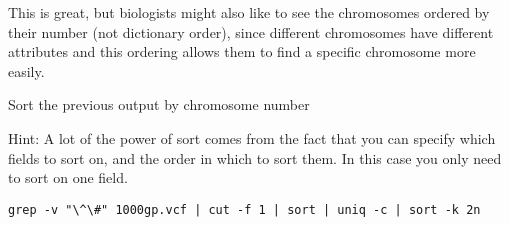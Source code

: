 \begin{note}
This is great, but biologists might also like to see the chromosomes ordered by their number (not dictionary order), since different chromosomes have different attributes and this ordering allows them to find a specific chromosome more easily.
\end{note}
\begin{questions}
Sort the previous output by chromosome number

Hint: A lot of the power of sort comes from the fact that you can specify which fields to sort on, and the order in which to sort them. In this case you only need to sort on one field.
\begin{answer}
\begin{lstlisting}
grep -v "\^\#" 1000gp.vcf | cut -f 1 | sort | uniq -c | sort -k 2n
\end{lstlisting}
\end{answer}
\end{questions}
